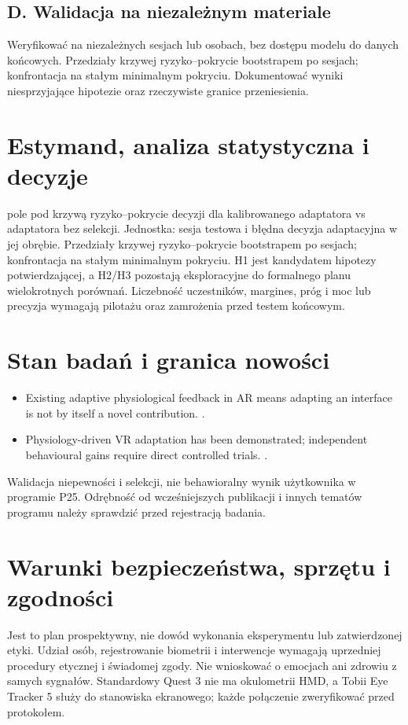 \documentclass[11pt,a4paper]{article}
\begin{document}
\subsection{D. Walidacja na niezależnym materiale}
Weryfikować na niezależnych sesjach lub osobach, bez dostępu modelu do danych końcowych. Przedziały krzywej ryzyko–pokrycie bootstrapem po sesjach; konfrontacja na stałym minimalnym pokryciu. Dokumentować wyniki niesprzyjające hipotezie oraz rzeczywiste granice przeniesienia.
\section{Estymand, analiza statystyczna i decyzje}
pole pod krzywą ryzyko–pokrycie decyzji dla kalibrowanego adaptatora vs adaptatora bez selekcji. Jednostka: sesja testowa i błędna decyzja adaptacyjna w jej obrębie. Przedziały krzywej ryzyko–pokrycie bootstrapem po sesjach; konfrontacja na stałym minimalnym pokryciu. H1 jest kandydatem hipotezy potwierdzającej, a H2/H3 pozostają eksploracyjne do formalnego planu wielokrotnych porównań. Liczebność uczestników, margines, próg i moc lub precyzja wymagają pilotażu oraz zamrożenia przed testem końcowym.
\section{Stan badań i granica nowości}
\begin{itemize}
\item Existing adaptive physiological feedback in AR means adapting an interface is not by itself a novel contribution. \cite{xrprior1}.
\item Physiology-driven VR adaptation has been demonstrated; independent behavioural gains require direct controlled trials. \cite{xrprior2}.
\end{itemize}
Walidacja niepewności i selekcji, nie behawioralny wynik użytkownika w programie P25. Odrębność od wcześniejszych publikacji i innych tematów programu należy sprawdzić przed rejestracją badania.
\section{Warunki bezpieczeństwa, sprzętu i zgodności}
Jest to plan prospektywny, nie dowód wykonania eksperymentu lub zatwierdzonej etyki. Udział osób, rejestrowanie biometrii i interwencje wymagają uprzedniej procedury etycznej i świadomej zgody. Nie wnioskować o emocjach ani zdrowiu z samych sygnałów. Standardowy Quest 3 nie ma okulometrii HMD, a Tobii Eye Tracker 5 służy do stanowiska ekranowego; każde połączenie zweryfikować przed protokołem.
\end{document}
